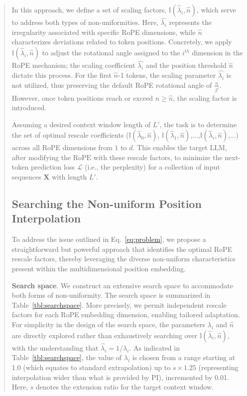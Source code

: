 \begin{abstract}
In this approach, we define a set of scaling factors, $\mathbb{I}(\hat{\lambda}_{i},\hat{n})$, which serve to address both types of non-uniformities. Here, $\hat{\lambda_i}$ represents the irregularity associated with specific RoPE dimensions, while $\hat{n}$ characterizes deviations related to token positions. Concretely, we apply $\mathbb{I}(\hat{\lambda}_{i},\hat{n})$ to adjust the rotational angle assigned to the $i^{th}$ dimension in the RoPE mechanism; the scaling coefficient $\hat{\lambda_i}$ and the position threshold $\hat{n}$ dictate this process. For the first $\hat{n}$-1 tokens, the scaling parameter $\hat{\lambda_{i}}$ is not utilized, thus preserving the default RoPE rotational angle of $\frac{n}{\beta^i}$. However, once token positions reach or exceed $n\ge\hat{n}$, the scaling factor is introduced.

Assuming a desired context window length of $L'$, the task is to determine the set of optimal rescale coefficients ($\mathbb{I}(\hat{\lambda}_{0},\hat{n})$, $\mathbb{I}(\hat{\lambda}_{1},\hat{n})$,...,$\mathbb{I}(\hat{\lambda}_{i},\hat{n})$,...) across all RoPE dimensions from $1$ to $d$. This enables the target $\text{LLM}$, after modifying the $\text{RoPE}$ with these rescale factors, to minimize the next-token prediction loss $\mathcal{L}$ (i.e., the perplexity) for a collection of input sequences $\mathbf{X}$ with length $L'$.

\subsection{Searching the Non-uniform Position Interpolation}

To address the issue outlined in Eq.~\ref{eq:problem}, we propose a straightforward but powerful approach that identifies the optimal RoPE rescale factors, thereby leveraging the diverse non-uniform characteristics present within the multidimensional position embedding.

\textbf{Search space}. We construct an extensive search space to accommodate both forms of non-uniformity. The search space is summarized in Table~\ref{tbl:searchspace}. More precisely, we permit independent rescale factors for each RoPE embedding dimension, enabling tailored adaptation. For simplicity in the design of the search space, the parameters $\lambda_i$ and $\hat{n}$ are directly explored rather than exhaustively searching over $\mathbb{I}(\hat{\lambda}_{i},\hat{n})$, with the understanding that $\hat{\lambda}_{i}=1/\lambda_i$. As indicated in Table~\ref{tbl:searchspace}, the value of $\lambda_i$ is chosen from a range starting at 1.0 (which equates to standard extrapolation) up to $s \times 1.25$ (representing interpolation wider than what is provided by PI), incremented by 0.01. Here, $s$ denotes the extension ratio for the target context window.


\end{abstract}
